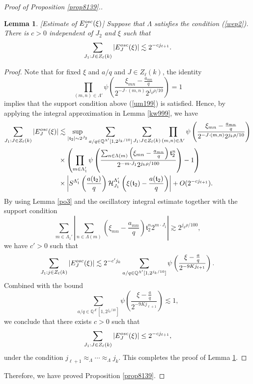 \documentclass[10pt,a4paper]{amsart}
\newtheorem{lemma}{Lemma}\numberwithin{lemma}{section}
\numberwithin{equation}{section}
\begin{document}
\begin{proof}[Proof of Proposition \ref{prop8139}.]
\begin{lemma}\label{lem574b9}[Estimate of $E^{\rm{osc}}_J(\xi)$] Suppose that $\Lambda$ satisfies   the  condition (\ref{wep2}). There is $c>0$ independent of $J_2$ and $\xi$ such that
$$\sum_{J_1:J\in Z_\ell(k)} |E^{\rm{osc}}_J(\xi)|\lesssim 2^{-cj_{\ell+1}}.$$
\end{lemma}
\begin{proof}  
 Note that for fixed $\xi$ and $a/q$ and $J\in Z_\ell(k)$, the identity $$\prod_{(m,n)\in \Lambda'} \psi\left(  \frac{  \xi_{mn}-\frac{a_{mn}}{q}}{ 2^{-J\cdot (m,n)}2^{j_k\rho/10}} \right)=1$$ implies that the support condition above  (\ref{um199}) is satisfied.
Hence, by applying  the integral approximation in Lemma \ref{kw999}, we have
\begin{align*} 
\sum_{J_1:J\in Z_{\ell}(k)} |E^{\rm{osc}}_{J}(\xi)| &\lesssim \sup_{|\mathfrak{t}_2|\sim 2^{J_2}} \sum_{ a/q\in \mathbb{Q}^{\Lambda'}[1,2^{j_k/10}]} \sum_{J_1:J\in Z_{\ell}(k)}       \prod_{(m,n)\in \Lambda'} \psi\left(  \frac{  \xi_{mn}-\frac{a_{mn}}{q}}{ 2^{-J\cdot (m,n)}2^{j_k\rho/10}} \right)  \nonumber \\
&\times \left(  \prod_{m\in\Lambda'_{1}}\psi\left( \frac{\sum_{n\in\Lambda(m)}\left( \xi_{mn}-\frac{a_{mn}}{q} \right)\mathfrak{t}_2^n }{2^{-m\cdot J_1} 2^{ j_k\rho/100}} \right) -1\right)\\
&\times \left|S^{\Lambda_{1}'}\left(\frac{a(\mathfrak{t}_2)}{q}\right)  \mathcal{H}^{\Lambda_{1}'}_{J_{1}}\left(\xi(\mathfrak{t}_2)-\frac{a(\mathfrak{t}_2)}{q}\right)\right| +O(2^{-cj_{\ell+1}}).\nonumber
\end{align*}
 By  using Lemma \ref{po3}  and the    oscillatory integral estimate together with   the support condition 
 $$ \sum_{m\in \Lambda_1'} \left|  \sum_{n\in\Lambda(m)}\left( \xi_{mn}-\frac{a_{mn}}{q} \right)\mathfrak{t}_2^n 2^{m\cdot J_1}    \right|\gtrsim  2^{ j_k\rho/100},$$ we have $c'>0$ such that $$ \sum_{J_1:j\in Z_{\ell}(k)} |E^{\rm{osc}}_{J}(\xi)|\lesssim 2^{-c'j_{k}}  \sum_{ a/q\in \mathbb{Q}^{\Lambda'}[1,2^{j_k/10}]}  \psi\left(\frac{\xi-\frac{a}{q}}{2^{-9Kj_{\ell+1}}}\right).$$    Combined with the bound $$ \sum_{ a/q\in \mathbb{Q}^{\Lambda'}[1,2^{j_k/10}]}  \psi\left(\frac{\xi-\frac{a}{q}}{2^{-9Kj_{\ell+1}}}\right)\lesssim 1,$$ we conclude that there exists $c>0$ such that
\begin{align*} 
\sum_{J_1:J\in Z_{\ell}(k)} |E^{\rm{osc}}_{J}(\xi)| \le 2^{-cj_{\ell+1}},
\end{align*}
under the condition $j_{\ell+1}\approx_{\Lambda}\cdots\approx_{\Lambda} j_k$.
This completes the proof of Lemma \ref{lem574b9}.
\end{proof}
Therefore, we have proved Proposition \ref{prop8139}.
\end{proof}
\end{document}
